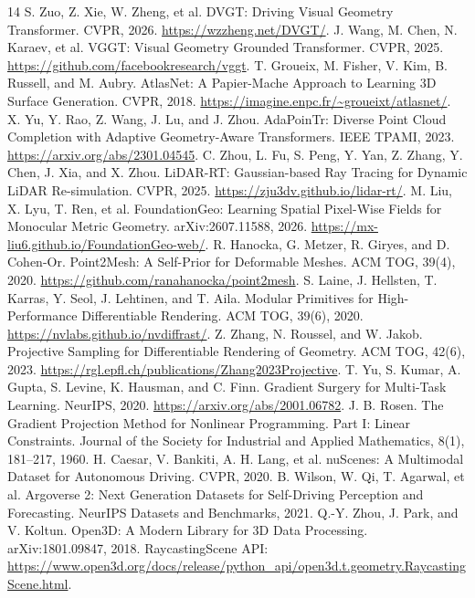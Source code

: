 {\small
\begin{thebibliography}{14}
 S. Zuo, Z. Xie, W. Zheng, et al. DVGT: Driving Visual Geometry Transformer. CVPR, 2026. \url{https://wzzheng.net/DVGT/}.
 J. Wang, M. Chen, N. Karaev, et al. VGGT: Visual Geometry Grounded Transformer. CVPR, 2025. \url{https://github.com/facebookresearch/vggt}.
 T. Groueix, M. Fisher, V. Kim, B. Russell, and M. Aubry. AtlasNet: A Papier-Mache Approach to Learning 3D Surface Generation. CVPR, 2018. \url{https://imagine.enpc.fr/~groueixt/atlasnet/}.
 X. Yu, Y. Rao, Z. Wang, J. Lu, and J. Zhou. AdaPoinTr: Diverse Point Cloud Completion with Adaptive Geometry-Aware Transformers. IEEE TPAMI, 2023. \url{https://arxiv.org/abs/2301.04545}.
 C. Zhou, L. Fu, S. Peng, Y. Yan, Z. Zhang, Y. Chen, J. Xia, and X. Zhou. LiDAR-RT: Gaussian-based Ray Tracing for Dynamic LiDAR Re-simulation. CVPR, 2025. \url{https://zju3dv.github.io/lidar-rt/}.
 M. Liu, X. Lyu, T. Ren, et al. FoundationGeo: Learning Spatial Pixel-Wise Fields for Monocular Metric Geometry. arXiv:2607.11588, 2026. \url{https://mx-liu6.github.io/FoundationGeo-web/}.
 R. Hanocka, G. Metzer, R. Giryes, and D. Cohen-Or. Point2Mesh: A Self-Prior for Deformable Meshes. ACM TOG, 39(4), 2020. \url{https://github.com/ranahanocka/point2mesh}.
 S. Laine, J. Hellsten, T. Karras, Y. Seol, J. Lehtinen, and T. Aila. Modular Primitives for High-Performance Differentiable Rendering. ACM TOG, 39(6), 2020. \url{https://nvlabs.github.io/nvdiffrast/}.
 Z. Zhang, N. Roussel, and W. Jakob. Projective Sampling for Differentiable Rendering of Geometry. ACM TOG, 42(6), 2023. \url{https://rgl.epfl.ch/publications/Zhang2023Projective}.
 T. Yu, S. Kumar, A. Gupta, S. Levine, K. Hausman, and C. Finn. Gradient Surgery for Multi-Task Learning. NeurIPS, 2020. \url{https://arxiv.org/abs/2001.06782}.
 J. B. Rosen. The Gradient Projection Method for Nonlinear Programming. Part I: Linear Constraints. Journal of the Society for Industrial and Applied Mathematics, 8(1), 181--217, 1960.
 H. Caesar, V. Bankiti, A. H. Lang, et al. nuScenes: A Multimodal Dataset for Autonomous Driving. CVPR, 2020.
 B. Wilson, W. Qi, T. Agarwal, et al. Argoverse 2: Next Generation Datasets for Self-Driving Perception and Forecasting. NeurIPS Datasets and Benchmarks, 2021.
 Q.-Y. Zhou, J. Park, and V. Koltun. Open3D: A Modern Library for 3D Data Processing. arXiv:1801.09847, 2018. RaycastingScene API: \url{https://www.open3d.org/docs/release/python_api/open3d.t.geometry.RaycastingScene.html}.
\end{thebibliography}
}
